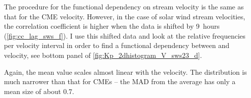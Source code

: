 The procedure for the functional dependency on stream velocity is the same as that for the CME velocity. However, in the case of solar wind stream velocities, the correlation coefficient is higher when the data is shifted by 9~hours (\autoref{fig:cc_lag_sws_f}).
I use this shifted data and look at the relative frequencies per velocity interval in order to find a functional dependency between \Kp{} and velocity, see bottom panel of \autoref{fig:Kp_2dhistogram_V_sws23_d}.
\begin{figure}
\end{figure}
Again, the mean \Kp{} value scales almost linear with the velocity. The distribution is much narrower than that for CMEs -- the MAD from the average \Kp{} has only a mean size of about \num{0.7}.

